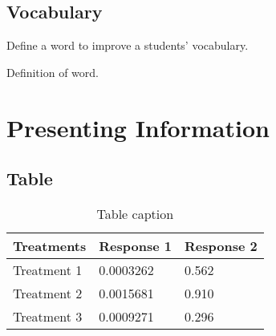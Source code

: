 \documentclass[12pt,fleqn]{book} %
\begin{document}

\section{Vocabulary}

Define a word to improve a students' vocabulary.

\begin{vocabulary}[Word]
Definition of word.
\end{vocabulary}










\chapter{Presenting Information}

\section{Table}

\begin{table}[h]
\centering
\begin{tabular}{l l l}
\toprule
\textbf{Treatments} & \textbf{Response 1} & \textbf{Response 2}\\
\midrule
Treatment 1 & 0.0003262 & 0.562 \\
Treatment 2 & 0.0015681 & 0.910 \\
Treatment 3 & 0.0009271 & 0.296 \\
\bottomrule
\end{tabular}
\caption{Table caption}
\end{table}

\end{document}
